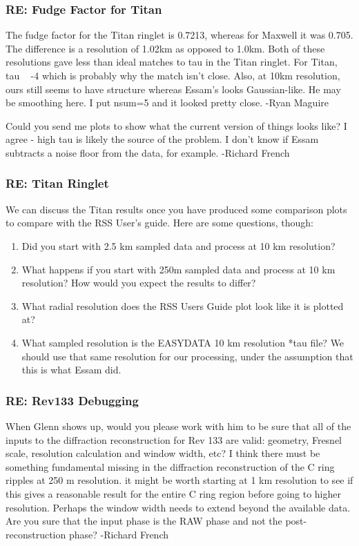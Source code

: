 \documentclass[crop=false,class=article,oneside]{standalone}
\begin{document}
\subsubsection{\footnotesize RE: Fudge Factor for Titan}
The fudge factor for the Titan ringlet is 0.7213, whereas for Maxwell it was 0.705. The difference is a resolution of 1.02km as opposed to 1.0km. Both of these resolutions gave less than ideal matches to tau in the Titan ringlet. For Titan, tau ~ -4 which is probably why the match isn't close.  Also, at 10km resolution, ours still seems to have structure whereas Essam's looks Gaussian-like. He may be smoothing here. I put nsum=5 and it looked pretty close. -Ryan Maguire\par
Could you send me plots to show what the current version of things looks like?
I agree - high tau is likely the source of the problem. I don't know if Essam subtracts a noise floor from the data, for example. -Richard French
\subsubsection{\footnotesize RE: Titan Ringlet}
We can discuss the Titan results once you have produced some comparison plots to compare with the RSS User's guide. Here are some questions, though:
\begin{enumerate}
    \item Did you start with 2.5 km sampled data and process at 10 km resolution?
    \item What happens if you start with 250m sampled data and process at 10 km resolution? How would you expect the results to differ?
    \item What radial resolution does the RSS Users Guide plot look like it is plotted at?
    \item What sampled resolution is the EASYDATA 10 km resolution *tau file? We should use that same resolution for our processing, under the assumption that this is what Essam did.
\end{enumerate}
\subsubsection{\footnotesize RE: Rev133 Debugging}
When Glenn shows up, would you please work with him to be sure that all of the inputs to the diffraction reconstruction for Rev 133 are valid: geometry, Fresnel scale, resolution calculation and window width, etc? I think there must be something fundamental missing in the diffraction reconstruction of the C ring ripples  at 250 m resolution. it might be worth starting at 1 km resolution to see if this gives a reasonable result for the entire C ring region before going to higher resolution. Perhaps the window width needs to extend beyond the available data. Are you sure that the input phase is the RAW phase and not the post-reconstruction phase? -Richard French
\end{document}
